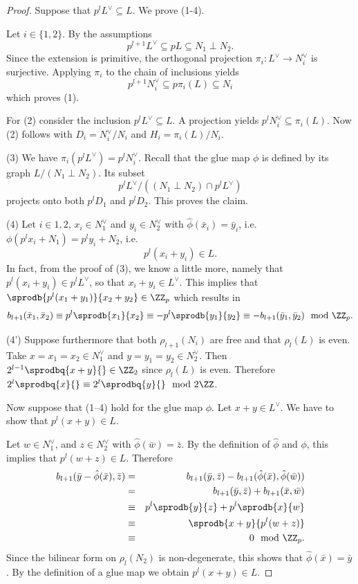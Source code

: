 \begin{proof}
Suppose that $p^l L^\vee \subseteq L$. We prove (1-4).

Let $i \in\{1,2\}$. By the assumptions
\[p^{l+1} L^\vee \subseteq p L \subseteq N_1 \perp N_2.\]
Since the extension is primitive, the orthogonal projection $\pi_i \colon L^\vee \rightarrow N_i^\vee$ is surjective. Applying $\pi_i$ to the chain of inclusions yields
\[p^{l+1} N_i^\vee \subseteq p \pi_i(L) \subseteq N_i\]
which proves (1).

For (2) consider the inclusion $p^lL^\vee \subseteq L$.
A projection yields $p^l N_i^\vee \subseteq \pi_i(L)$. Now (2) follows with $D_i = N_i^\vee / N_i$ and  $H_i = \pi_i(L)/N_i$.

(3) We have $\pi_i(p^l L^\vee) =  p^l N_i^\vee$.
Recall that the glue map $\phi$ is defined by its graph $L/(N_1 \perp N_2)$.
Its subset
\[p^l L^\vee / ((N_1 \perp N_2) \cap p^lL^\vee)\]
projects onto both $p^l D_1$ and $p^l D_2$. This proves the claim.

(4) Let $i\in{1,2}$, $x_i \in N_1^\vee$ and $y_i \in N_2^\vee$ with $\hat \phi(\bar x_i) = \bar y_i$, i.e. $\phi(p^l x_i + N_1) = p^l y_i + N_2$, i.e.
\[p^l(x_i+y_i) \in L.\]
In fact, from the proof of (3), we know a little more, namely that $p^l(x_i+y_i) \in p^l L^\vee$, so that $x_i+y_i \in L^\vee$.
This implies that $\sprodb{p^l(x_1+y_1)}{x_2+y_2} \in \ZZ_p$ which results in
\[b_{l+1}(\bar x_1, \bar x_2) \equiv p^{l}\sprodb{x_1}{x_2} \equiv - p^{l}\sprodb{y_1}{y_2} \equiv - b_{l+1}(\bar y_1, \bar y_2) \mod \ZZ_p.\]

(4') Suppose furthermore that both $\rho_{l+1}(N_i)$ are free and that $\rho_l(L)$ is even. Take $x=x_1=x_2 \in N_1^\vee$ and $y=y_1=y_2 \in N_2^\vee$.
Then $2^{l-1}\sprodbq{x+y}{} \in  \ZZ_2$ since $\rho_{l}(L)$ is even.
Therefore $2^{l}\sprodbq{x}{} \equiv 2^l\sprodbq{y}{} \mod 2 \ZZ$.

Now suppose that (1--4) hold for the glue map $\phi$.
Let $x + y \in L^\vee$. We have to show that $p^l(x+y) \in L$.

Let $w \in N_1^\vee$, and $z \in N_2^\vee$ with $\hat \phi( \bar w )=\bar z$.
By the definition of $\hat \phi$ and $\phi$, this implies that $p^l(w+z) \in L$. Therefore
\begin{eqnarray*}
b_{l+1}(\bar y - \hat \phi(\bar x),\bar z)
&= &b_{l+1}( \bar y, \bar z) - b_{l+1}(\hat \phi (\bar x), \hat \phi(\bar w))\\
&=&b_{l+1}( \bar y, \bar z) + b_{l+1}(\bar x, \bar w)\\
&\equiv& p^l\sprodb{y}{ z} + p^{l}\sprodb{x}{w} \\
&\equiv & \sprodb{x+y}{p^l(w+z)}\\
&\equiv& 0 \mod \ZZ_p.
\end{eqnarray*}
Since the bilinear form on $\rho_l(N_2)$ is non-degenerate, this shows that
$\hat \phi(\bar x)=\bar y$. By the definition of a glue map we obtain $p^l(x+y) \in L$.


\end{proof}

